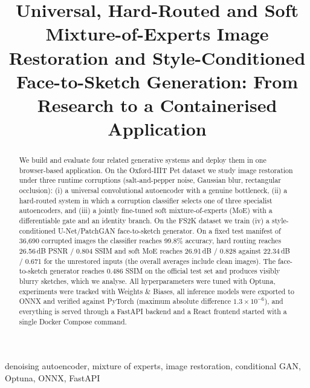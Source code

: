 \documentclass[conference]{IEEEtran}
\begin{document}
\title{Universal, Hard-Routed and Soft Mixture-of-Experts Image Restoration and Style-Conditioned Face-to-Sketch Generation: From Research to a Containerised Application}

\author{
}

\maketitle

\begin{abstract}
We build and evaluate four related generative systems and deploy them in one browser-based application. On the Oxford-IIIT Pet dataset we study image restoration under three runtime corruptions (salt-and-pepper noise, Gaussian blur, rectangular occlusion): (i) a universal convolutional autoencoder with a genuine bottleneck, (ii) a hard-routed system in which a corruption classifier selects one of three specialist autoencoders, and (iii) a jointly fine-tuned soft mixture-of-experts (MoE) with a differentiable gate and an identity branch. On the FS2K dataset we train (iv) a style-conditioned U-Net/PatchGAN face-to-sketch generator. On a fixed test manifest of 36{,}690 corrupted images the classifier reaches 99.8\% accuracy, hard routing reaches 26.56\,dB PSNR / 0.804 SSIM and soft MoE reaches 26.91\,dB / 0.828 against 22.34\,dB / 0.671 for the unrestored inputs (the overall averages include clean images). The face-to-sketch generator reaches 0.486 SSIM on the official test set and produces visibly blurry sketches, which we analyse. All hyperparameters were tuned with Optuna, experiments were tracked with Weights \& Biases, all inference models were exported to ONNX and verified against PyTorch (maximum absolute difference $1.3\times10^{-6}$), and everything is served through a FastAPI backend and a React frontend started with a single Docker Compose command.
\end{abstract}

\begin{IEEEkeywords}
denoising autoencoder, mixture of experts, image restoration, conditional GAN, Optuna, ONNX, FastAPI
\end{IEEEkeywords}
\end{document}
